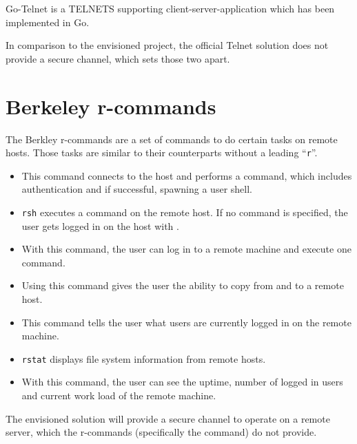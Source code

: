 \documentclass[10pt,a4paper,titlepage,twoside,english,final]{zhawreprt}
\begin{document}
Go-Telnet \citep{gotelnet} is a \gls{TELNETS} supporting client-server-application which has been implemented in \gls{Go}.

In comparison to the envisioned project, the official Telnet solution does not provide a secure channel, which sets those two apart.

\section{Berkeley r-commands}\label{sec:BerkeleyRCommands}
The Berkley r-commands are a set of commands to do certain tasks on remote hosts.
Those tasks are similar to their counterparts without a leading ``\texttt{r}''.
\begin{itemize}
\item \cite{rlogin}

This command connects to the host and performs a \cite{login} command, which includes authentication and if successful, spawning a user \gls{shell}.

\item \cite{rsh}

\texttt{rsh} executes a command on the remote host. If no command is specified, the user gets logged in on the host with \cite{rlogin}.

\item \cite{rexec}

With this command, the user can log in to a remote machine and execute one command.

\item \cite{rcp}

Using this command gives the user the ability to copy from and to a remote host.

\item \cite{rwho}

This command tells the user what users are currently logged in on the remote machine.

\item \cite{rstat}

\texttt{rstat} displays file system information from remote hosts.

\item \cite{ruptime}

With this command, the user can see the \gls{uptime}, number of logged in users and current work load of the remote machine.
\end{itemize}

The envisioned solution will provide a secure channel to operate on a remote server, which the r-commands (specifically the \cite{rlogin} command) do not provide.
\end{document}
